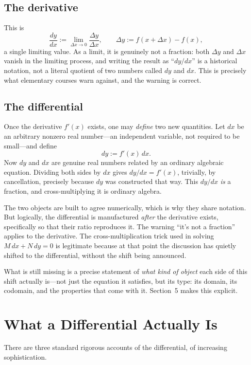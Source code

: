 \documentclass{essay}
\begin{document}
\subsection*{The derivative}
This is
\[ \frac{dy}{dx} := \lim_{\Delta x \to 0} \frac{\Delta y}{\Delta x}, \qquad \Delta y := f(x + \Delta x) - f(x), \]
a single limiting value. As a limit, it is genuinely not a fraction: both \(\Delta y\) and \(\Delta x\) vanish in the limiting process, and writing the result as ``\(dy/dx\)'' is a historical notation, not a literal quotient of two numbers called \(dy\) and \(dx\). This is precisely what elementary courses warn against, and the warning is correct.

\subsection*{The differential}
Once the derivative \(f'(x)\) exists, one may \emph{define} two new quantities. Let \(dx\) be an arbitrary nonzero real number---an independent variable, not required to be small---and define
\[ dy := f'(x)\,dx. \]
Now \(dy\) and \(dx\) are genuine real numbers related by an ordinary algebraic equation. Dividing both sides by \(dx\) gives \(dy/dx = f'(x)\), trivially, by cancellation, precisely because \(dy\) was constructed that way. This \(dy/dx\) \emph{is} a fraction, and cross-multiplying it is ordinary algebra.

The two objects are built to agree numerically, which is why they share notation. But logically, the differential is manufactured \emph{after} the derivative exists, specifically so that their ratio reproduces it. The warning ``it's not a fraction'' applies to the derivative. The cross-multiplication trick used in solving \(M\,dx + N\,dy = 0\) is legitimate because at that point the discussion has quietly shifted to the differential, without the shift being announced.

What is still missing is a precise statement of \emph{what kind of object} each side of this shift actually is---not just the equation it satisfies, but its type: its domain, its codomain, and the properties that come with it. Section~5 makes this explicit.

\section{What a Differential Actually Is}

There are three standard rigorous accounts of the differential, of increasing sophistication.
\end{document}
